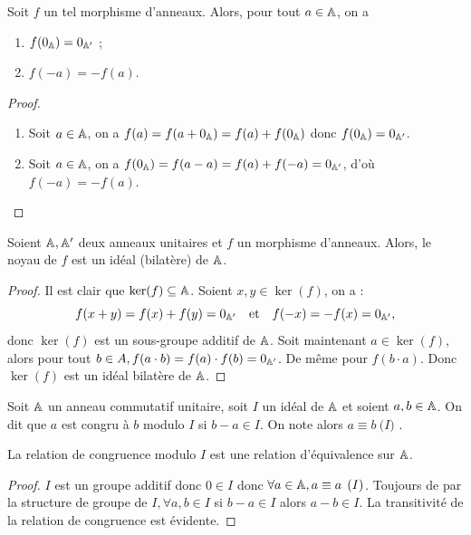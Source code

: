 \begin{lem}
Soit $f$ un tel morphisme d'anneaux. Alors, pour tout $a \in \mathbb{A}$, on a
\begin{enumerate}[label=(\roman*)]
\item $f(0_{\mathbb{A}}) = 0_{\mathbb{A}'}$ ;
\item $f(-a) = -f(a)$.
\end{enumerate}
\end{lem}

\begin{proof}
\begin{enumerate}[label=(\roman*)]
\item Soit $a \in \mathbb{A}$, on a $f(a)=f(a+0_{\mathbb{A}})=f(a)+f(0_{\mathbb{A}})$ donc $f(0_{\mathbb{A}})=0_{\mathbb{A}'}$. 
\item Soit $a \in \mathbb{A}$, on a $f(0_{\mathbb{A}}) = f(a-a) = f(a) + f(-a) = 0_{\mathbb{A}'}$, d'où $f(-a) = -f(a)$.
\end{enumerate}
\end{proof}

\begin{thm}
\label{lem:noyau}
Soient $\mathbb{A}, \mathbb{A}'$ deux anneaux unitaires et $f$ un morphisme d'anneaux. 
Alors, le noyau de $f$ est un idéal (bilatère) de $\mathbb{A}$.
\end{thm}

\begin{proof}
Il est clair que $\ker(f) \subseteq \mathbb{A}$. Soient $x, y \in \ker(f)$, on a :
\[ f(x+y) = f(x) + f(y) = 0_{\mathbb{A}'} \quad \text{et} \quad f(-x) = -f(x) = 0_{\mathbb{A}'} , \]
donc $\ker(f)$ est un sous-groupe additif de $\mathbb{A}$. \newline
Soit maintenant $a \in \ker(f)$, alors pour tout $b \in A, f(a \cdot b) = f(a) \cdot f(b) = 0_{\mathbb{A}'}$. De même pour $f(b \cdot a)$. 
Donc $\ker(f)$ est un idéal bilatère de $\mathbb{A}$.
\end{proof}

\begin{defn}
Soit $\mathbb{A}$ un anneau commutatif unitaire, soit $I$ un idéal de $\mathbb{A}$ et soient $a, b \in \mathbb{A}$. 
On dit que $a$ est congru à $b$ modulo $I$ si $b-a \in I$. 
On note alors $a\equiv b \pod{I}$ .
\end{defn}

\begin{thm}
La relation de congruence modulo $I$ est une relation d'équivalence sur $\mathbb{A}$.
\end{thm}

\begin{proof}
$I$ est un groupe additif donc $0 \in I$ donc $\forall a \in \mathbb{A}, a \equiv a \pod{I}$. 
Toujours de par la structure de groupe de $I, \forall a,b \in I$ si $b-a \in I$ alors $a-b \in I$.
La transitivité de la relation de congruence est évidente.
\end{proof}


